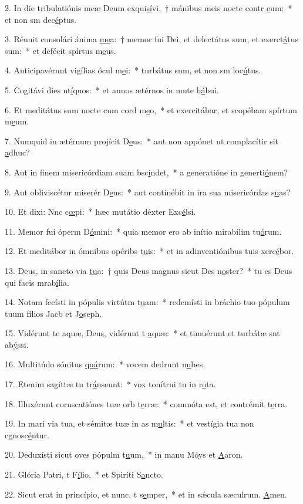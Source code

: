 2. In die tribulatiónis meæ Deum exqui\uline{sí}vi,~† mánibus meis nocte contr \uline{e}um:~* et non sm dec\uline{é}ptus.\par 
3. Rénuit consolári ánima \uline{me}a:~† memor fui Dei, et delectátus sum, et exerct\uline{á}tus sum:~* et defécit spírtus m\uline{e}us.\par 
4. Anticipavérunt vigílias ócul m\uline{e}i:~* turbátus sum, et non sm loc\uline{ú}tus.\par 
5. Cogitávi dies nt\uline{í}quos:~* et annos ætérnos in mnte h\uline{á}bui.\par 
6. Et meditátus sum nocte cum cord m\uline{e}o,~* et exercitábar, et scopébam spírtum m\uline{e}um.\par 
7. Numquid in ætérnum projícit D\uline{e}us:~* aut non appónet ut complacítir sit \uline{a}dhuc?\par 
8. Aut in finem misericórdiam suam bsc\uline{í}ndet,~* a generatióne in generti\uline{ó}nem?\par 
9. Aut obliviscétur miserér D\uline{e}us:~* aut continébit in ira sua misericórdas s\uline{u}as?\par 
10. Et dixi: Nnc c\uline{œ}pi:~* hæc mutátio déxter Exc\uline{é}lsi.\par 
11. Memor fui óperm D\uline{ó}mini:~* quia memor ero ab inítio mirabílim tu\uline{ó}rum.\par 
12. Et meditábor in ómnibus opéribs t\uline{u}is:~* et in adinventiónibus tuis xerc\uline{é}bor.\par 
13. Deus, in sancto via \uline{tu}a:~† quis Deus magnus sicut Des n\uline{o}ster?~* tu es Deus qui facis mrab\uline{í}lia.\par 
14. Notam fecísti in pópulis virtútm t\uline{u}am:~* redemísti in bráchio tuo pópulum tuum fílios Jacb et J\uline{o}seph.\par 
15. Vidérunt te aquæ, Deus, vidérunt t \uline{a}quæ:~* et timuérunt et turbátæ snt ab\uline{ý}ssi.\par 
16. Multitúdo sónitus \uline{quá}rum:~* vocem dedrunt n\uline{u}bes.\par 
17. Etenim sagíttæ tu tr\uline{á}nseunt:~* vox tonítrui tu in r\uline{o}ta.\par 
18. Illuxérunt coruscatiónes tuæ orb t\uline{e}rræ:~* commóta est, et contrémit t\uline{e}rra.\par 
19. In mari via tua, et sémitæ tuæ in as m\uline{u}ltis:~* et vestígia tua non cgnosc\uline{é}ntur.\par 
20. Deduxísti sicut oves pópulm t\uline{u}um,~* in manu Móys et \uline{A}aron.\par 
21. Glória Patri, t F\uline{í}lio,~* et Spiríti S\uline{a}ncto.\par 
22. Sicut erat in princípio, et nunc, t s\uline{e}mper,~* et in sǽcula sæculrum. \uline{A}men.\par 
